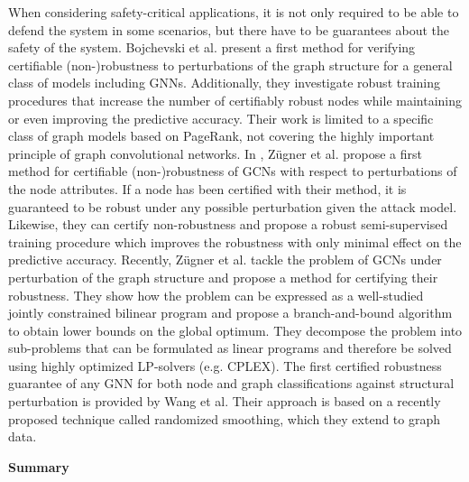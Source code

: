 \documentclass[a4paper,preprint]{sig-alternate}
\begin{document}
When considering safety-critical applications, it is not only required to be able to defend the system in some scenarios, but there
have to be guarantees about the safety of the system.\newline
Bojchevski et al. \cite{bojchevski2019certifiable} present a first method for verifying certifiable
(non-)robustness to perturbations of the graph structure for a general class of models including GNNs. Additionally, they investigate robust 
training procedures that increase the number of certifiably robust nodes while maintaining or even improving the predictive accuracy.
Their work is limited to a specific class of graph models based on PageRank, not covering the highly important principle of graph convolutional
networks. \cite{10.1145/3394486.3403217}\newline
In \cite{Z_gner_2019}, Zügner et al. propose a first method for certifiable (non-)robustness of GCNs with respect to 
perturbations of the node attributes. If a node has been certified with their method, it is guaranteed to be robust under any
possible perturbation given the attack model. Likewise, they can certify non-robustness and propose a robust semi-supervised training
procedure which improves the robustness with only minimal effect on the predictive accuracy.\newline
Recently, Zügner et al. \cite{10.1145/3394486.3403217} tackle the problem of GCNs under perturbation of the graph structure and propose a method
for certifying their robustness. They show how the problem can be expressed as a well-studied jointly constrained bilinear program and
propose a branch-and-bound algorithm to obtain lower bounds on the global optimum. They decompose the problem into sub-problems that can
be formulated as linear programs and therefore be solved using highly optimized LP-solvers (e.g. CPLEX).\newline
The first certified robustness guarantee of any GNN for both node and graph classifications against structural perturbation
is provided by Wang et al.\cite{wang2020certified} Their approach is based on a recently proposed technique called randomized smoothing,
which they extend to graph data.\newline

\textbf{Summary}\newline
\end{document}
